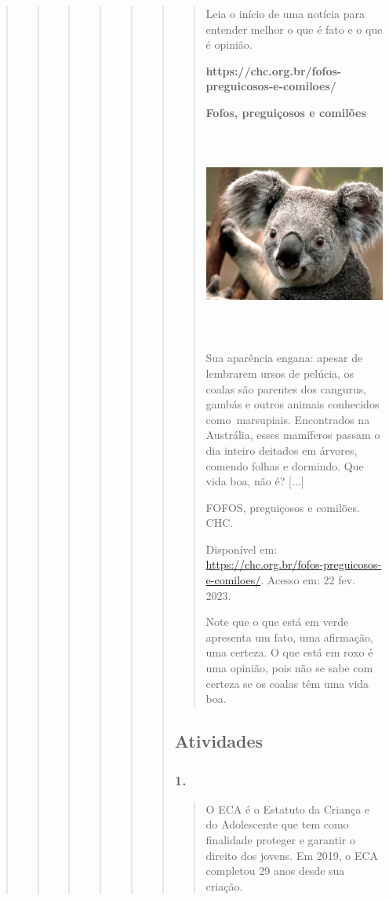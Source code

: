 \begin{quote}
\begin{quote}
\begin{quote}
\begin{quote}
\begin{quote}
\begin{quote}
\begin{quote}
Leia o início de uma notícia para entender melhor o que é fato e o que é
opinião.

\textbf{https://chc.org.br/fofos-preguicosos-e-comiloes/}

\textbf{Fofos, preguiçosos e comilões}

\includegraphics[width=3.61389in,height=2.71042in]{media/image25.jpeg}

Sua aparência engana: apesar de lembrarem ursos de pelúcia, os coalas
são parentes dos cangurus, gambás e outros animais conhecidos
como~marsupiais. Encontrados na Austrália, esses mamíferos passam o dia
inteiro deitados em árvores, comendo folhas e dormindo. Que vida boa,
não é? {[}...{]}

FOFOS, preguiçosos e comilões. CHC.

Disponível em: \url{https://chc.org.br/fofos-preguicosos-e-comiloes/}.
Acesso em: 22 fev. 2023.

Note que o que está em verde apresenta um fato, uma afirmação, uma
certeza. O que está em roxo é uma opinião, pois não se sabe com certeza
se os coalas têm uma vida boa.
\end{quote}

\subsection{Atividades}\label{atividades-7}

\subsubsection{1. }\label{section-60}

\begin{quote}
O ECA é o Estatuto da Criança e do Adolescente que tem como finalidade
proteger e garantir o direito dos jovens. Em 2019, o ECA completou 29
anos desde sua criação.


\end{quote}
\end{quote}
\end{quote}
\end{quote}
\end{quote}
\end{quote}
\end{quote}

